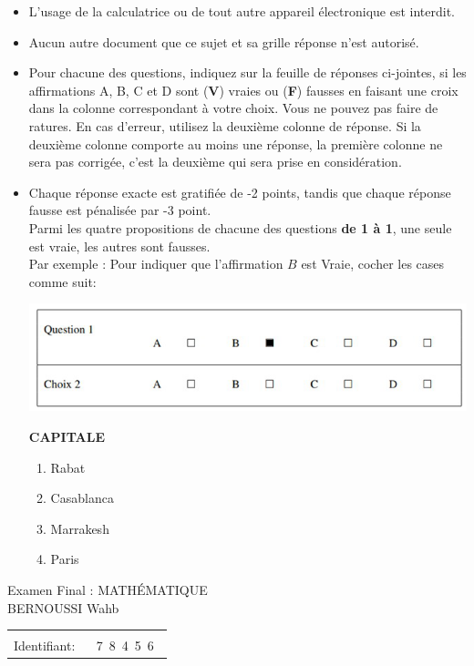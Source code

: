 \documentclass{book}%
\begin{document}
\begin{itemize}%
\item%
L'usage de la calculatrice ou de tout autre appareil électronique est interdit.%
\item%
Aucun autre document que ce sujet et sa grille réponse n'est autorisé.%
\item%
Pour chacune des questions, indiquez sur la feuille de réponses ci-jointes, si les affirmations A, B, C et D sont (\textbf{V}) vraies ou (\textbf{F}) fausses en faisant une croix dans la colonne correspondant à votre choix. Vous ne pouvez pas faire de ratures. En cas d'erreur, utilisez la deuxième colonne de réponse. Si la deuxième colonne comporte au moins une réponse, la première colonne ne sera pas corrigée, c'est la deuxième qui sera prise en considération.%
\item%
Chaque réponse exacte est gratifiée de -2 points, tandis que chaque réponse fausse est pénalisée par -3 point. \\ 	Parmi les quatre propositions de chacune des questions \textbf{de 1 à 1}, une seule est vraie, les autres sont fausses. \\ 	Par exemple : Pour indiquer que l'affirmation $B$ est Vraie, cocher les cases comme suit:  \\ \begin{center}	\includegraphics[scale=0.8]{reponses.png} \end{center}%
\thispagestyle{empty}%
\begin{exercise}%
\textbf{CAPITALE }%
\begin{enumerate}[label=\textbf{\Alph*. }]%
\item%
Rabat%
\item%
Casablanca%
\item%
Marrakesh%
\item%
Paris%
\end{enumerate}%
\end{exercise}%
\end{itemize}%
\newpage%
\thispagestyle{empty}%
Examen Final : MATHÉMATIQUE $\qquad \qquad \qquad \qquad \qquad \qquad \qquad \qquad$ BERNOUSSI Wahb%
\begin{flushright}%
\begin{tabular}{|l|}%
\hline%
 \\%
\thispagestyle{empty}%
Identifiant: $\quad$ {\Large 7~8~4~5~6~}%
 \\%
\hline%
\end{tabular}%
\end{flushright}%
\end{document}
